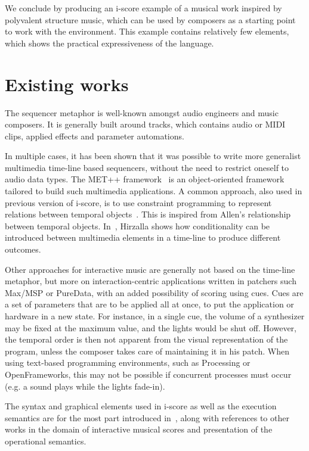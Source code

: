 \documentclass{article}
\begin{document}
We conclude by producing an i-score example of a musical work inspired by polyvalent structure music,
which can be used by composers as a starting point to work with the environment. 
This example contains relatively few elements, which shows the practical expressiveness of the language.

\section{Existing works}
The sequencer metaphor is well-known amongst audio engineers and music composers. 
It is generally built around tracks, which contains audio or MIDI clips, applied effects 
and parameter automations.

In multiple cases, it has been shown that it was possible to write 
more generalist multimedia time-line based sequencers, without the need to restrict oneself 
to audio data types. 
The MET++ framework~\cite{ackermann1994direct} is an object-oriented framework 
tailored to build such multimedia applications.
A common approach, also used in previous version of i-score, is to use constraint programming 
to represent relations between temporal objects~\cite{allombert2006concurrent, song1999interactive, toro2010concurrent}. 
This is inspired from Allen's relationship between temporal objects.
In~\cite{hirzalla1995temporal}, Hirzalla shows how conditionality can be introduced between multimedia elements in a time-line to produce different outcomes.

Other approaches for interactive music are generally not based on the time-line metaphor, 
but more on interaction-centric applications written in patchers such Max/MSP or PureData, 
with an added possibility of scoring using cues. 
Cues are a set of parameters that are to be applied all at once, to put the application or hardware in a new state.
For instance, in a single cue, the volume of a synthesizer may be fixed at the maximum value, and the lights would be shut off.
However, the temporal order is then not apparent from the visual representation of the program, 
unless the composer takes care of maintaining it in his patch.
When using text-based programming environments, such as Processing or OpenFrameworks, this may not be possible if concurrent processes must occur (e.g. a sound plays while the lights fade-in).

The syntax and graphical elements used in i-score as well as the 
execution semantics are for the most part introduced in~\cite{celerier2015ossia, baltazar2014score}, along 
with references to other works in the domain of interactive musical scores and presentation of the operational semantics.
\end{document}
